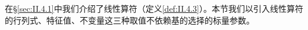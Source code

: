 \documentclass[main.tex]{subfiles}
\begin{document}
在\S\ref{sec:II.4.1}中我们介绍了线性算符（定义\ref{def:II.4.3}）。本节我们以引入线性算符的行列式、特征值、不变量这三种取值不依赖基的选择的标量参数。
\end{document}
